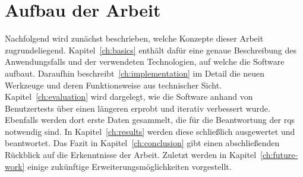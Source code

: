 \section{Aufbau der Arbeit}\label{sec:structure}

Nachfolgend wird zunächst beschrieben, welche Konzepte dieser Arbeit zugrundeliegend.
Kapitel~\ref{ch:basics} enthält dafür eine genaue Beschreibung des Anwendungsfalls und der verwendeten Technologien, auf welche die Software aufbaut.
Daraufhin beschreibt~\ref{ch:implementation} im Detail die neuen Werkzeuge und deren Funktionsweise aus technischer Sicht.
Kapitel~\ref{ch:evaluation} wird dargelegt, wie die Software anhand von Benutzertests über einen längeren erprobt und iterativ verbessert wurde.
Ebenfalls werden dort erste Daten gesammelt, die für die Beantwortung der \acp{rq} notwendig sind.
In Kapitel~\ref{ch:results} werden diese schließlich ausgewertet und beantwortet.
Das Fazit in Kapitel~\ref{ch:conclusion} gibt einen abschließenden Rückblick auf die Erkenntnisse der Arbeit.
Zuletzt werden in Kapitel~\ref{ch:future-work} einige zukünftige Erweiterungsmöglichkeiten vorgestellt.
